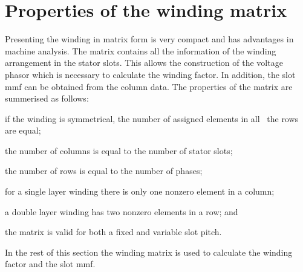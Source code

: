 \section{Properties of the winding matrix}
Presenting the winding in matrix form is very compact and has advantages in machine analysis. The matrix contains all the information of the winding arrangement in the stator slots. This allows the construction of the voltage phasor which is necessary to calculate the winding factor. In addition, the slot mmf can be obtained from the column data. The properties of the matrix are summerised as follows:
\begin{itemize*}
	\item if the winding is symmetrical, the number of assigned elements in all~%
	the rows are equal;
	\item the number of columns is equal to the number of stator slots;
	\item the number of rows is equal to the number of phases;
	\item for a single layer winding there is only one nonzero element in a column;
	\item a double layer winding has two nonzero elements in a row; and
	\item the matrix is valid for both a fixed and variable slot pitch.
\end{itemize*}
In the rest of this section the winding matrix is used to calculate the winding factor and the slot mmf.

